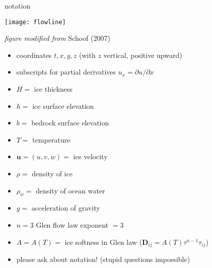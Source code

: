 \begin{comment}
\begin{frame}{outside of scope}

\large\emph{not} \normalsize covered here:\normalsize
\medskip

  \begin{itemize}
  \item Stokes and ``higher order'' flow equations
  \item thermomechanical coupling or polythermal ice
  \item subglacial hydrology/processes
  \item mass balance and snow/firn processes
  \item constitutive relations other than Glen isotropic
  \item grounding lines, calving fronts, ocean interaction
  \item paleo-climate and ``spin-up''
  \item earth deformation under ice sheet load
  \item other numerics: FEM, spectral, multigrid, parallel, \dots
  \item etc.
  \end{itemize}

\end{frame}
\end{comment}

\begin{frame}{notation} 

\begin{center}
  \texttt{[image: flowline]}

\tiny \emph{figure modified from} Schoof (2007)
\end{center}

\scriptsize
  \begin{itemize}
  \item coordinates $t,x,y,z$  (with $z$ vertical, positive upward)
  \item subscripts for partial derivatives $u_x = \partial u/\partial x$
  \item $H=$ ice thickness
  \item $h=$ ice surface elevation
  \item $b=$ bedrock surface elevation
  \item $T=$ temperature
  \item $\mathbf{u}=(u,v,w)=$ ice velocity
  \item $\rho=$ density of ice
  \item $\rho_w=$ density of ocean water
  \item $g=$ acceleration of gravity
  \item $n=3$ Glen flow law exponent $=3$
  \item $A=A(T)=$ ice softness in Glen law ($\mathbf{D}_{ij} = A(T) \tau^{n-1} \tau_{ij}$)
  \item \alert{please ask about notation!}  (stupid questions impossible)
  \end{itemize}

\end{frame}


